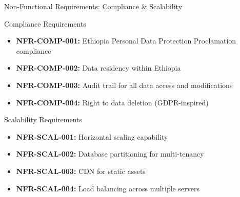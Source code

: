 \begin{frame}{Non-Functional Requirements: Compliance \& Scalability}
    \begin{block}{Compliance Requirements}
        \begin{itemize}
            \item \textbf{NFR-COMP-001:} Ethiopia Personal Data Protection Proclamation compliance
            \item \textbf{NFR-COMP-002:} Data residency within Ethiopia
            \item \textbf{NFR-COMP-003:} Audit trail for all data access and modifications
            \item \textbf{NFR-COMP-004:} Right to data deletion (GDPR-inspired)
        \end{itemize}
    \end{block}
    
    \begin{block}{Scalability Requirements}
        \begin{itemize}
            \item \textbf{NFR-SCAL-001:} Horizontal scaling capability
            \item \textbf{NFR-SCAL-002:} Database partitioning for multi-tenancy
            \item \textbf{NFR-SCAL-003:} CDN for static assets
            \item \textbf{NFR-SCAL-004:} Load balancing across multiple servers
        \end{itemize}
    \end{block}
\end{frame}
